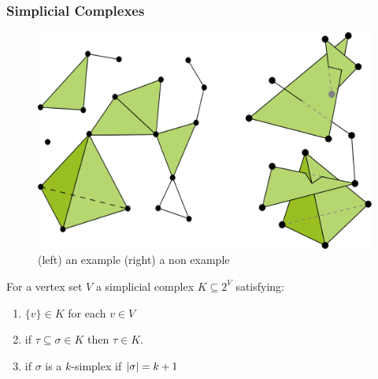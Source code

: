 \begin{frame}[fragile]
\frametitle{Simplicial Complexes}
\begin{figure}
\centering
  \includegraphics[width=.6\textwidth]{simplicial}
 \caption{(left) an example \phantom{2000}  (right) a non example}
\end{figure}
For a vertex set $V$ a simplicial complex $K \subseteq 2^V$ satisfying:
\begin{enumerate}
\item $\{ v \} \in K$ for each $v \in V$
\item if $\tau \subseteq \sigma \in K$  then $\tau \in K$. 
\item if $\sigma$ is a $k$-simplex if $\left|{\sigma}\right| = k+1$ 
\end{enumerate}
\end{frame}

